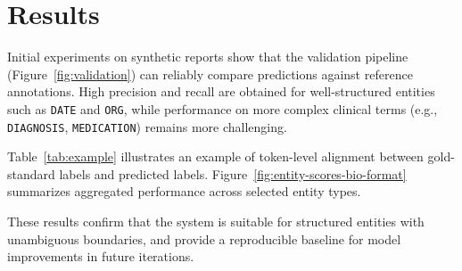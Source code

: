 \documentclass[conference]{IEEEtran}
\begin{document}
\section{Results}
Initial experiments on synthetic reports show that the validation pipeline 
(Figure~\ref{fig:validation}) can reliably compare predictions against reference annotations. 
High precision and recall are obtained for well-structured entities such as \texttt{DATE} and \texttt{ORG}, 
while performance on more complex clinical terms (e.g., \texttt{DIAGNOSIS}, \texttt{MEDICATION}) remains more challenging.

Table~\ref{tab:example} illustrates an example of token-level alignment between 
gold-standard labels and predicted labels. Figure~\ref{fig:entity-scores-bio-format} summarizes 
aggregated performance across selected entity types.

These results confirm that the system is suitable for structured entities with 
unambiguous boundaries, and provide a reproducible baseline for model 
improvements in future iterations.

\end{document}
